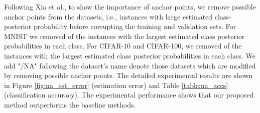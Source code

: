 \documentclass{article}
\begin{document}
Following Xia et al., to show the importance of anchor points, we remove possible anchor points from the datasets, i.e., instances with large estimated class-posterior probability  before corrupting the training and validation sets. For MNIST we removed  of the instances with the largest estimated class posterior probabilities in each class. For CIFAR-10 and CIFAR-100, we removed  of the instances with the largest estimated class posterior probabilities in each class. We add "/NA" following the dataset's name denote those datasets which are modified by removing possible anchor points. The detailed experimental results are shown in Figure \ref{fig:na_est_error} (estimation error) and Table \ref{table:na_accs} (classification accuracy). The experimental performance shows that our proposed method outperforms the baseline methods.
 
 
\end{document}
